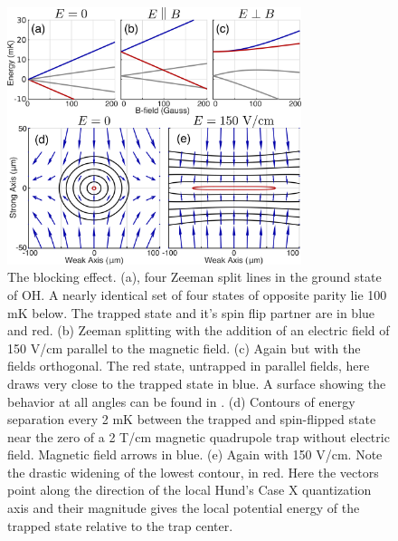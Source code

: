 \documentclass[%
 reprint,
 amsmath,amssymb,
 aps,
prl,
]{revtex4-1}
\begin{document}
\begin{figure}[h]
\includegraphics[width=86mm]{Blocking/blocking.png}%
\caption{
The blocking effect. (a), four Zeeman split lines in the ground state of OH. A nearly identical set of four states of opposite parity lie 100 mK below. The trapped state and it's spin flip partner are in blue and red. (b) Zeeman splitting with the addition of an electric field of 150 V/cm parallel to the magnetic field. (c) Again but with the fields orthogonal. The red state, untrapped in parallel fields, here draws very close to the trapped state in blue. A surface showing the behavior at all angles can be found in \cite{Stuhl2013}. (d) Contours of energy separation every 2 mK between the trapped and spin-flipped state near the zero of a 2 T/cm magnetic quadrupole trap without electric field. Magnetic field arrows in blue. (e) Again with 150 V/cm. Note the drastic widening of the lowest contour, in red. Here the vectors point along the direction of the local Hund's Case X quantization axis \cite{Bohn2013} and their magnitude gives the local potential energy of the trapped state relative to the trap center.
\label{fig:blocking}}
\end{figure}
\end{document}
